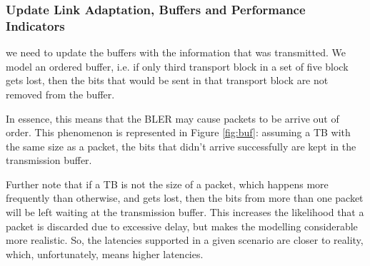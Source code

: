 \subsubsection*{Update Link Adaptation, Buffers and Performance Indicators}

we need to update the buffers with the information that was transmitted. We model an ordered buffer, i.e. if only third transport block in a set of five block gets lost, then the bits that would be sent in that transport block are not removed from the buffer.

In essence, this means that the BLER may cause packets to be arrive out of order. This phenomenon is represented in Figure \ref{fig:buf}: assuming a TB with the same size as a packet, the bits that didn't arrive successfully are kept in the transmission buffer.



Further note that if a TB is not the size of a packet, which happens more frequently than otherwise, and gets lost, then the bits from more than one packet will be left waiting at the transmission buffer. This increases the likelihood that a packet is discarded due to excessive delay, but makes the modelling considerable more realistic. So, the latencies supported in a given scenario are closer to reality, which, unfortunately, means higher latencies.
